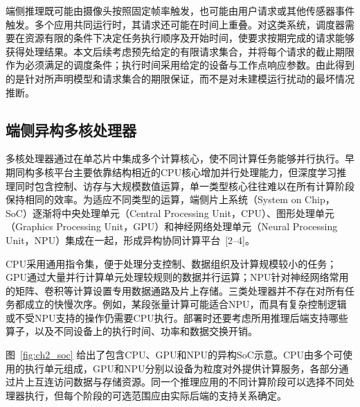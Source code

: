 端侧推理既可能由摄像头按照固定帧率触发，也可能由用户请求或其他传感器事件触发。多个应用共同运行时，其请求还可能在时间上重叠。对这类系统，调度器需要在资源有限的条件下决定任务执行顺序及开始时间，使要求按期完成的请求能够获得处理结果。本文后续考虑预先给定的有限请求集合，并将每个请求的截止期限作为必须满足的调度条件；执行时间采用给定的设备与工作点响应参数。由此得到的是针对所声明模型和请求集合的期限保证，而不是对未建模运行扰动的最坏情况推断。

\subsection{端侧异构多核处理器}

多核处理器通过在单芯片中集成多个计算核心，使不同计算任务能够并行执行。早期同构多核平台主要依靠结构相近的CPU核心增加并行处理能力，但深度学习推理同时包含控制、访存与大规模数值运算，单一类型核心往往难以在所有计算阶段保持相同的效率。为适应不同类型的运算，端侧片上系统（System on Chip，SoC）逐渐将中央处理单元（Central Processing Unit，CPU）、图形处理单元（Graphics Processing Unit，GPU）和神经网络处理单元（Neural Processing Unit，NPU）集成在一起，形成异构协同计算平台~[2--4]。

CPU采用通用指令集，便于处理分支控制、数据组织及计算规模较小的任务；GPU通过大量并行计算单元处理较规则的数据并行运算；NPU针对神经网络常用的矩阵、卷积等计算设置专用数据通路及片上存储。三类处理器并不存在对所有任务都成立的快慢次序。例如，某段张量计算可能适合NPU，而具有复杂控制逻辑或不受NPU支持的操作仍需要CPU执行。部署时还要考虑所用推理后端支持哪些算子，以及不同设备上的执行时间、功率和数据交换开销。

图~\ref{fig:ch2_soc} 给出了包含CPU、GPU和NPU的异构SoC示意。CPU由多个可使用的执行单元组成，GPU和NPU分别以设备为粒度对外提供计算服务，各部分通过片上互连访问数据与存储资源。同一个推理应用的不同计算阶段可以选择不同处理器执行，但每个阶段的可选范围应由实际后端的支持关系确定。

